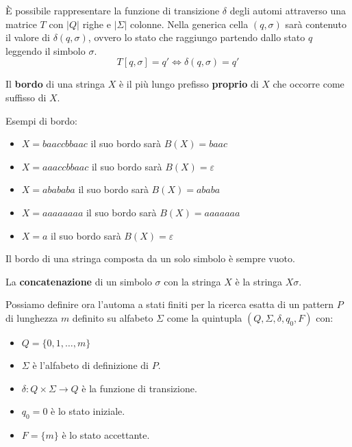 È possibile rappresentare la funzione di transizione $\delta$ degli automi
attraverso una matrice $T$ con $|Q|$ righe e $|\Sigma|$ colonne. Nella generica
cella $(q, \sigma)$ sarà contenuto il valore di $\delta(q, \sigma)$, ovvero lo
stato che raggiungo partendo dallo stato $q$ leggendo il simbolo $\sigma$.
\begin{equation}
    T[q,\sigma] = q' \iff \delta(q,\sigma) = q'
\end{equation}
\begin{definizione}
    Il \textbf{bordo} di una stringa $X$ è il più lungo prefisso \textbf{proprio}
    di $X$ che occorre come suffisso di $X$.
\end{definizione}
\begin{esempio}
    Esempi di bordo:
    \begin{itemize}
        \item $X = baaccbbaac$ il suo bordo sarà $B(X) = baac$
        \item $X = aaaccbbaac$ il suo bordo sarà $B(X) = \varepsilon$
        \item $X = abababa$ il suo bordo sarà $B(X) = ababa$
        \item $X = aaaaaaaa$ il suo bordo sarà $B(X) = aaaaaaa$
        \item $X = a$ il suo bordo sarà $B(X) = \varepsilon$
    \end{itemize}
\end{esempio}
\begin{nota}
    Il bordo di una stringa composta da un solo simbolo è sempre vuoto.
\end{nota}
\begin{definizione}
    La \textbf{concatenazione} di un simbolo $\sigma$ con la stringa $X$ è la
    stringa $X\sigma$.
\end{definizione}
Possiamo definire ora l'automa a stati finiti per la ricerca esatta di un pattern
$P$ di lunghezza $m$ definito su alfabeto $\Sigma$ come la quintupla $(Q, \Sigma,
    \delta, q_0, F)$ con:
\begin{itemize}
    \item $Q = \{0, 1, \dots, m\}$
    \item $\Sigma$ è l'alfabeto di definizione di $P$.
    \item $\delta: Q \times \Sigma \to Q$ è la funzione di transizione.
    \item $q_0 = 0$ è lo stato iniziale.
    \item $F = \{m\}$ è lo stato accettante.
\end{itemize}
